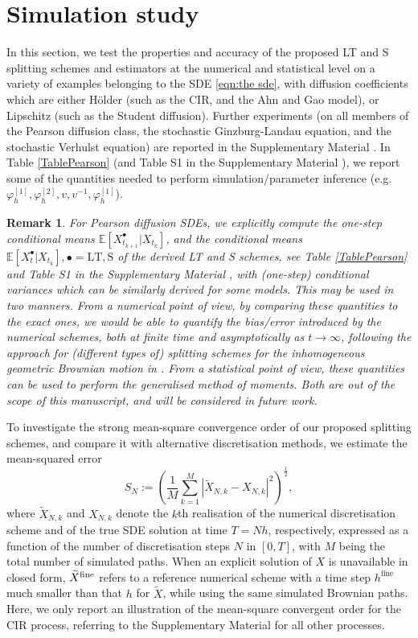 \documentclass[a4paper,12pt]{article}
\numberwithin{equation}{section}
\theoremstyle{plain}
\newtheorem{remark}{Remark}
\theoremstyle{definition}
\begin{document}
\section{Simulation study}\label{sec:numerical results}
In this section, we test the properties and accuracy of the proposed LT and S splitting schemes and estimators at the numerical and statistical level on a variety of examples belonging to the SDE \eqref{eqn:the sde}, with diffusion coefficients which are either H\"older (such as the CIR, and the Ahn and Gao model), or  Lipschitz (such as the Student diffusion). Further experiments (on all members of the Pearson diffusion class, the stochastic Ginzburg-Landau equation, and the stochastic Verhulst equation) are reported in the Supplementary Material \cite{Fangetal26}. In Table \ref{TablePearson} (and Table S1 in  the Supplementary Material \cite{Fangetal26}), we report some of the quantities needed to perform simulation/parameter inference (e.g. $\varphi_h^{[1]}, \varphi^{[2]}_h, v, v^{-1}, \varphi_h^{[1]}$).
\begin{remark}\label{remarkPearson}
For Pearson diffusion SDEs, we explicitly compute the one-step conditional means $\mathbb{E}[X^\bullet_{t_{k+1}}|X_{t_k}]$, and the  conditional means $\mathbb{E}[X^\bullet_{t}|X_{t_k}], \bullet=\textrm{LT}, \textrm{S}$ 
of the derived LT and S schemes, see Table \ref{TablePearson} and Table S1 in the Supplementary Material \cite{Fangetal26}, with (one-step) conditional variances which can be similarly derived for some models. This may be used in two manners. From a numerical point of view,
by comparing these quantities to the exact ones, we would be able to quantify the bias/error introduced by the numerical schemes, both at finite time and asymptotically as $t\to\infty$, following the approach for (different types of) splitting schemes for the inhomogeneous geometric Brownian motion in \cite{tubikanec_qualitative_2022}. From a statistical point of view, these quantities can be used to perform the generalised method of moments. Both are out of the scope of this manuscript, and  will be considered in future work.
\end{remark}
To investigate the strong mean-square convergence order of our proposed splitting schemes, and compare it with alternative discretisation methods, we estimate the mean-squared error 
\begin{equation}\label{eqn:MSE}
S_N:=\left(\frac{1}{M} \sum_{k=1}^M\left|\widetilde X_{N,k}-X_{N,k}\right|^2\right)^{\frac{1}{2}},
\end{equation}
where $\widetilde X_{N,k}$ and $X_{N,k}$ denote the $k$th realisation of the numerical discretisation scheme and of the true SDE solution at time $T=Nh$, respectively, expressed as a function of the number of discretisation steps $N$ in $[0,T]$, with $M$ being the total number of simulated paths. When an explicit solution of $X$ is unavailable in closed form, $\widetilde X^{\rm{fine}}$ refers to a reference numerical scheme with a time step $h^{\textrm{fine}}$ much smaller than that $h$ for $\widetilde{X}$,  while using the same simulated Brownian paths. Here, we only report an illustration of the mean-square convergent order for the CIR process, referring to the Supplementary Material \cite{Fangetal26} for all other processes.
\end{document}
